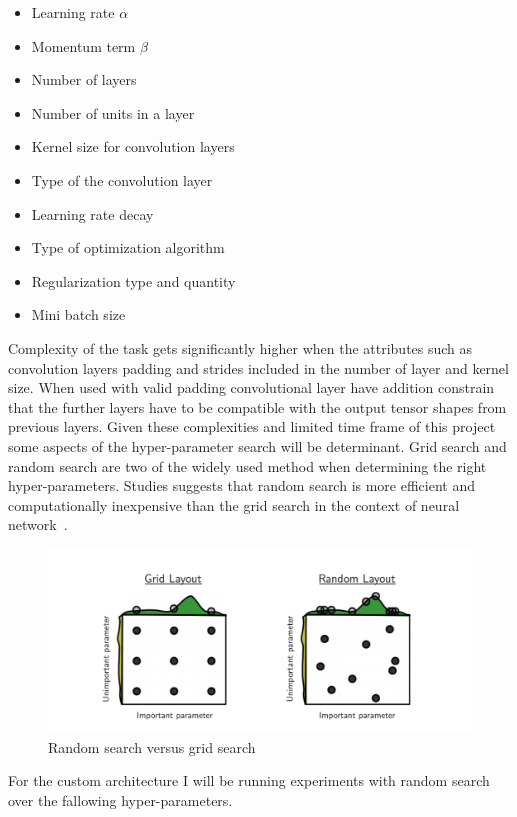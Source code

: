 \begin{itemize}
    \item Learning rate $\alpha$
    \item Momentum term $\beta$
    \item Number of layers
    \item Number of units in a layer
    \item Kernel size for convolution layers
    \item Type of the convolution layer
    \item Learning rate decay
    \item Type of optimization algorithm
    \item Regularization type and quantity
    \item Mini batch size
\end{itemize}

Complexity of the task gets significantly higher when the attributes such as convolution layers padding and strides included in the number of layer and kernel size.
When used with valid padding convolutional layer have addition constrain that the further layers have to be compatible with the output tensor shapes from previous layers.
Given these complexities and limited time frame of this project some aspects of the hyper-parameter search will be determinant.
Grid search and random search are two of the widely used method when determining the right hyper-parameters.
Studies suggests that random search is more efficient and computationally inexpensive than the grid search in the context of neural network~\cite{randomsearch}.

\begin{figure}[H]
    \centering
    \includegraphics[width=\textwidth]{img/randomsearch.png}
    \caption{Random search versus grid search~\cite{randomsearch}}
    \label{fig:randomsearch}
\end{figure}

For the custom architecture I will be running experiments with random search over the fallowing hyper-parameters.

